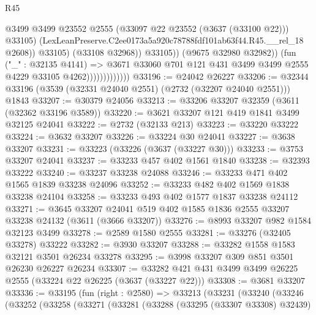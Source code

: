 \begin{lexlean}{R45}
\begin{coremodule}
                                          @3499
                                          @3499
                                          @23552
                                          @2555
                                          (@33097 @22 @23552 (@3637 (@33100 @22)))
                                          @33105)
                                        (LexLeanPreserve.C2ee0173a5a920c78788fdf101ab63f44.R45.__rel_18
                                          @2608))
                                      @33105)
                                    (@33108 @32968))
                                  @33105))
                              (@9675 @32980 @32982))
                            (fun ("_" : @32135 @4141) =>
                            @3671
                              @33060
                              @701
                              @121
                              @431
                              @3499
                              @3499
                              @2555
                              @4229
                              @33105
                              @4262)))))))))))))
@33196 := @24042 @26227
@33206 := @32344 @33196 (@3539 (@32331 @24040 @2551) (@2732 (@32207 @24040 @2551))) @1843
@33207 := @30379 @24056
@33213 := @33206 @33207 @32359 (@3611 (@32362 @33196 @3589))
@33220 := @3621 @33207 @121 @419 @1841 @3499 @32125 @24041
@33222 := @2732 (@32133 @213)
@33223 := @33220 @33222
@33224 := @3632 @33207
@33226 := @33224 @30 @24041
@33227 := @3638 @33207
@33231 := @33223 (@33226 (@3637 (@33227 @30)))
@33233 := @3753 @33207 @24041
@33237 := @33233 @457 @402 @1561 @1840
@33238 := @32393 @33222
@33240 := @33237 @33238 @24088
@33246 := @33233 @471 @402 @1565 @1839 @33238 @24096
@33252 := @33233 @482 @402 @1569 @1838 @33238 @24104
@33258 := @33233 @493 @402 @1577 @1837 @33238 @24112
@33271 := @3645
    @33207
    @24041
    @519
    @402
    @1585
    @1836
    @2555
    @33207
    @33238
    @24132
    (@3611 (@3666 @33207))
@33276 := @8993 @33207 @982 @1584 @32123 @3499
@33278 := @2589 @1580 @2555
@33281 := @33276 (@32405 @33278) @33222
@33282 := @3930 @33207
@33288 := @33282 @1558 @1583 @32121 @3501 @26234 @33278
@33295 := @3998 @33207 @309 @851 @3501 @26230 @26227 @26234
@33307 := @33282 @421 @431 @3499 @3499 @26225 @2555 (@33224 @22 @26225 (@3637 (@33227 @22)))
@33308 := @3681 @33207
@33336 := @33195
    (fun (right : @2580) =>
    @33213
      (@33231
        (@33240
          (@33246
            (@33252
              (@33258
                (@33271
                  (@33281
                    (@33288
                      (@33295 (@33307 @33308) @32439)

\end{coremodule}
\end{lexlean}
